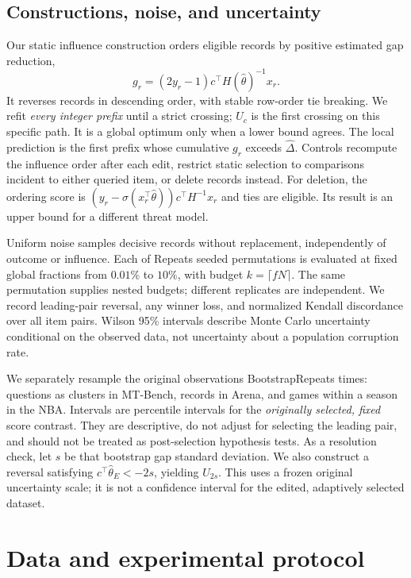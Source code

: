 \documentclass{article}
\newcommand{\num}[1]{\csname #1\endcsname}
\begin{document}
\subsection{Constructions, noise, and uncertainty}
\label{sec:baselines}
Our static influence construction orders eligible records by positive estimated gap reduction,
\begin{equation}
 g_r=(2y_r-1)c^\top H(\hat\theta)^{-1}x_r. \label{eq:influence}
\end{equation}
It reverses records in descending order, with stable row-order tie breaking. We refit \emph{every integer prefix} until a strict crossing; $U_c$ is the first crossing on this specific path. It is a global optimum only when a lower bound agrees. The local prediction is the first prefix whose cumulative $g_r$ exceeds $\hat\Delta$. Controls recompute the influence order after each edit, restrict static selection to comparisons incident to either queried item, or delete records instead. For deletion, the ordering score is $(y_r-\sigma(x_r^\top\hat\theta))c^\top H^{-1}x_r$ and ties are eligible. Its result is an upper bound for a different threat model.

Uniform noise samples decisive records without replacement, independently of outcome or influence. Each of \num{Repeats} seeded permutations is evaluated at fixed global fractions from $0.01\%$ to $10\%$, with budget $k=\lceil fN\rceil$. The same permutation supplies nested budgets; different replicates are independent. We record leading-pair reversal, any winner loss, and normalized Kendall discordance over all item pairs. Wilson 95\% intervals describe Monte Carlo uncertainty conditional on the observed data, not uncertainty about a population corruption rate.

We separately resample the original observations \num{BootstrapRepeats} times: questions as clusters in MT-Bench, records in Arena, and games within a season in the NBA. Intervals are percentile intervals for the \emph{originally selected, fixed} score contrast. They are descriptive, do not adjust for selecting the leading pair, and should not be treated as post-selection hypothesis tests. As a resolution check, let $s$ be that bootstrap gap standard deviation. We also construct a reversal satisfying $c^\top\hat\theta_E<-2s$, yielding $U_{2s}$. This uses a frozen original uncertainty scale; it is not a confidence interval for the edited, adaptively selected dataset.

\section{Data and experimental protocol}
\label{sec:data}
\begin{table}[t]
\caption{Real-data main panels. $n_\ell$ is original leader support. Intervals use record/game resampling or question clusters, as applicable. NBA years denote season-ending years. Scores are our ridge BT reconstruction.}
\label{tab:data}
\centering\small
\end{table}
\end{document}
